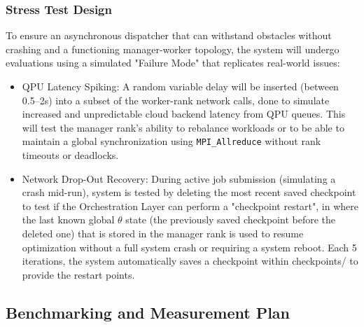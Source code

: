 \subsubsection{Stress Test Design}
To ensure an asynchronous dispatcher that can withstand obstacles without crashing and a functioning manager-worker topology, 
the system will undergo evaluations using a simulated "Failure Mode" that replicates real-world issues: 
    \begin{itemize}
        \item QPU Latency Spiking: A random variable delay will be inserted (between 0.5--2s) into a subset of the worker-rank network calls, done to simulate increased and unpredictable cloud backend latency from QPU queues. This will test the manager rank's ability to rebalance workloads or to be able to maintain a global synchronization using \texttt{MPI\_Allreduce} without rank timeouts or deadlocks. 
        \item Network Drop-Out Recovery: During active job submission (simulating a crash mid-run), system is tested by deleting the most recent saved checkpoint to test if the Orchestration Layer can perform a "checkpoint restart", in where the last known global $\theta$ state (the previously saved checkpoint before the deleted one) that is stored in the manager rank is used to resume optimization without a full system crash or requiring a system reboot. Each 5 iterations, the system automatically saves a checkpoint within checkpoints/ to provide the restart points. 
    \end{itemize}

\subsection{Benchmarking and Measurement Plan}
